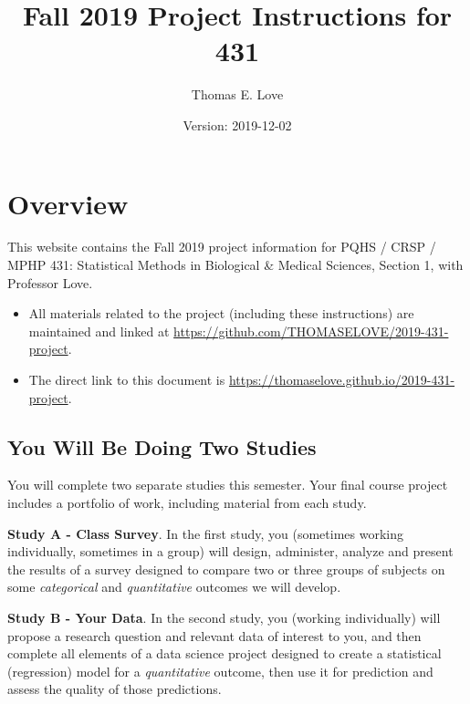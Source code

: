 \documentclass[]{book}
\title{Fall 2019 Project Instructions for 431}
\author{Thomas E. Love}
\date{Version: 2019-12-02}
\providecommand{\tightlist}{%
  \setlength{\itemsep}{0pt}\setlength{\parskip}{0pt}}
\begin{document}
\maketitle

{
\setcounter{tocdepth}{1}
\tableofcontents
}
\hypertarget{overview}{%
\chapter*{Overview}\label{overview}}

This website contains the Fall 2019 project information for PQHS / CRSP / MPHP 431: Statistical Methods in Biological \& Medical Sciences, Section 1, with Professor Love.

\begin{itemize}
\tightlist
\item
  All materials related to the project (including these instructions) are maintained and linked at \url{https://github.com/THOMASELOVE/2019-431-project}.
\item
  The direct link to this document is \url{https://thomaselove.github.io/2019-431-project}.
\end{itemize}

\hypertarget{you-will-be-doing-two-studies}{%
\section*{You Will Be Doing Two Studies}\label{you-will-be-doing-two-studies}}

You will complete two separate studies this semester. Your final course project includes a portfolio of work, including material from each study.

\textbf{Study A - Class Survey}. In the first study, you (sometimes working individually, sometimes in a group) will design, administer, analyze and present the results of a survey designed to compare two or three groups of subjects on some \emph{categorical} and \emph{quantitative} outcomes we will develop.

\textbf{Study B - Your Data}. In the second study, you (working individually) will propose a research question and relevant data of interest to you, and then complete all elements of a data science project designed to create a statistical (regression) model for a \emph{quantitative} outcome, then use it for prediction and assess the quality of those predictions.
\end{document}
